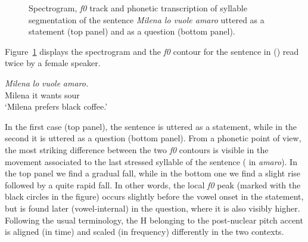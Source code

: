 \begin{figure}
\centering
{}
\caption{Spectrogram, \textit{f0} track and phonetic transcription of syllable segmentation of the sentence \textit{Milena lo vuole amaro} uttered as a statement (top panel) and as a question (bottom panel).}
\label{fig201}\end{figure}

Figure~\ref{fig201} displays the spectrogram and the \textit{f0} contour for the sentence in () read twice by a female speaker. 

\ea
\gll \textit{Milena} \textit{lo} \textit{vuole} \textit{amaro.}\\
Milena it wants sour\\
\glt ‘Milena prefers black coffee.’
\z

In the first case (top panel), the sentence is uttered as a statement, while in the second it is uttered as a question (bottom panel). From a phonetic point of view, the most striking difference between the two \textit{f0} contours is visible in the movement associated to the last stressed syllable of the sentence ( in \textit{amaro}). In the top panel we find a gradual fall, while in the bottom one we find a slight rise followed by a quite rapid fall. In other words, the local \textit{f0} peak (marked with the black circles in the figure) occurs slightly before the vowel onset in the statement, but is found later (vowel-internal) in the question, where it is also visibly higher. Following the usual terminology, the H belonging to the post-nuclear pitch accent is aligned (in time) and scaled (in frequency) differently in the two contexts.

